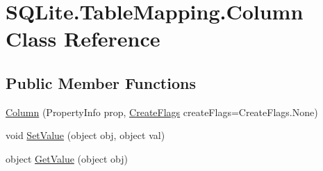\hypertarget{class_s_q_lite_1_1_table_mapping_1_1_column}{\section{S\+Q\+Lite.\+Table\+Mapping.\+Column Class Reference}
\label{class_s_q_lite_1_1_table_mapping_1_1_column}
}
\subsection*{Public Member Functions}
\begin{DoxyCompactItemize}
\item 
\hyperlink{class_s_q_lite_1_1_table_mapping_1_1_column_a404e36f92ab57bcc8f903a78dc47badf}{Column} (Property\+Info prop, \hyperlink{namespace_s_q_lite_a5ada328810363319c85c3e0c28c67479}{Create\+Flags} create\+Flags=Create\+Flags.\+None)
\item 
void \hyperlink{class_s_q_lite_1_1_table_mapping_1_1_column_a0f57d48181580599bd9b4aa6db68687c}{Set\+Value} (object obj, object val)
\item 
object \hyperlink{class_s_q_lite_1_1_table_mapping_1_1_column_ac2e9f8110d390d1fa630ebb0d345c293}{Get\+Value} (object obj)
\end{DoxyCompactItemize}
